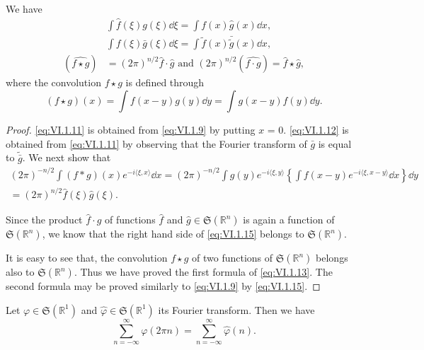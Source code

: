 \begin{corollaryn} We have
\begin{align}
&\int \hat {f} (\xi) g (\xi) \dd \xi = \int f (x) \hat {g} (x) \dd x, \label{eq:VI.1.11} \\
&\int f (\xi) \bar {g} (\xi) \dd \xi = \int \tilde {f} (x) \bar {\tilde {g}} (x) \dd x, \label{eq:VI.1.12} \\
(\widehat {f \star g})& = (2 \pi) ^{n/2} \widehat {f} \cdot \widehat {g} \text{ and } (2 \pi) ^{n/2} (\widehat {f \cdot g}) = \widehat {f} \star \widehat {g}, \label{eq:VI.1.13}
\end{align}
where the convolution $f \star g$ is defined through 
\begin{equation}\label{eq:VI.1.14}
(f \star g) (x) = \int f (x - y) g (y) \dd y = \int g (x - y) f (y) \dd y.
\end{equation}

\end{corollaryn}
\begin{proof}
 \eqref{eq:VI.1.11} is obtained from \eqref{eq:VI.1.9} by putting $x$ = $0$. \eqref{eq:VI.1.12} is obtained from \eqref{eq:VI.1.11} by observing that the Fourier transform of $\bar{g}$ is equal to $\tilde{\bar{g}}$. We next show that 
\begin{equation}\label{eq:VI.1.15}
\begin{gathered}
(2 \pi) ^{-n/2} \int (f * g) (x) e ^{- i \langle \xi , x \rangle} \dd x = (2 \pi) ^{-n/2} \int g (y) e ^{- i \langle \xi , y \rangle} \left\{\int f (x - y) e ^{- i \langle \xi , x - y \rangle} \dd x \right\} \dd y
\\
= (2 \pi) ^{n/2} \hat {f} (\xi) \hat {g} (\xi).
\end{gathered}
\end{equation}

Since the product $\hat{f} \cdot \hat{g}$ of functions $\hat{f}$ and $\hat{g} \in \mathfrak{S}(\mathbb{R}^{n})$ is again a function of $\mathfrak{S}(\mathbb{R}^{n})$, we know that the right hand side of \eqref{eq:VI.1.15} belongs to $\mathfrak{S}(\mathbb{R}^{n})$. 

It is easy to see that, the convolution $f \star g$ of two functions of $\mathfrak{S}(\mathbb{R}^{n})$ belongs also to $\mathfrak{S}(\mathbb{R}^{n})$. Thus we have proved the first formula of \eqref{eq:VI.1.13}. The second formula may be proved similarly to \eqref{eq:VI.1.9} by \eqref{eq:VI.1.15}. 
\end{proof}
\begin{theorem}\label{thm:VI.1.Theorem.2} Let $\varphi \in \mathfrak{S}(\mathbb{R}^{1})$ and $\hat{\varphi} \in \mathfrak{S}(\mathbb{R}^{1})$ its Fourier transform. Then we have 
\begin{equation}\label{eq:VI.1.16}
\sum\limits_{n = - \infty} ^{\infty} \varphi (2 \pi n) = \sum\limits_{n = - \infty} ^{\infty} \hat {\varphi} (n).
\end{equation}
\end{theorem}


